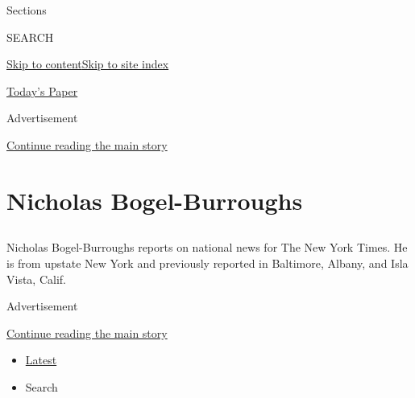 Sections

SEARCH

\protect\hyperlink{site-content}{Skip to
content}\protect\hyperlink{site-index}{Skip to site index}

\href{https://myaccount.nytimes.com/auth/login?response_type=cookie\&client_id=vi}{}

\href{https://www.nytimes.com/section/todayspaper}{Today's Paper}

Advertisement

\protect\hyperlink{after-top}{Continue reading the main story}

\hypertarget{nicholas-bogel-burroughs}{%
\section{Nicholas Bogel-Burroughs}\label{nicholas-bogel-burroughs}}

\subsection{}

Nicholas Bogel-Burroughs reports on national news for The New York
Times. He is from upstate New York and previously reported in Baltimore,
Albany, and Isla Vista, Calif.

Advertisement

\protect\hyperlink{after-mid1}{Continue reading the main story}

\begin{itemize}
\tightlist
\item
  \protect\hyperlink{stream-panel}{Latest}
\item
  Search
\end{itemize}

